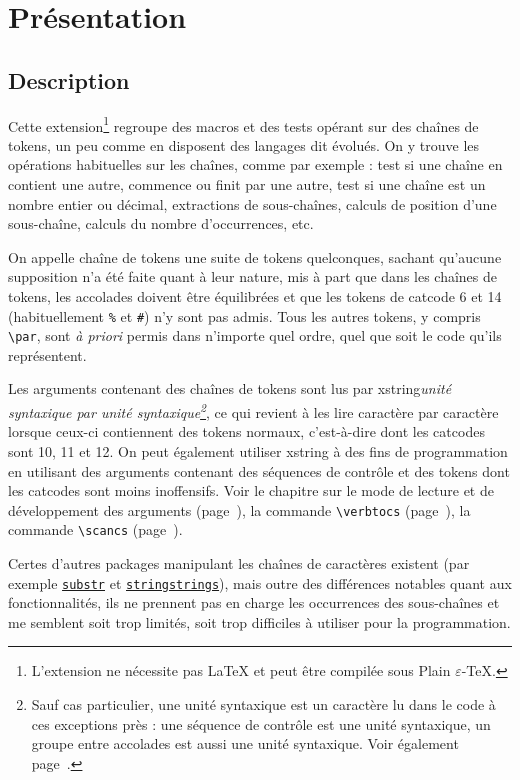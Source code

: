 \documentclass[a4paper,10pt,french]{article}
\newcommand\guill[1]{\og{}#1\fg{}}
\newcommand\US{unité syntaxique\xspace}
\newcommand\Xstring{\textsf{xstring}\xspace}
\newcommand\verbinline{\lstinline[basicstyle=\normalsize\ttfamily]}
\begin{document}
\tableofcontents

%
\section{Présentation}
\subsection{Description}
Cette extension\footnote{L'extension ne nécessite pas \LaTeX{} et peut être compilée sous Plain $\varepsilon$-\TeX{}.} regroupe des macros et des tests opérant sur des chaînes de tokens, un peu comme en disposent des langages dit \guill{évolués}. On y trouve les opérations habituelles sur les chaînes, comme par exemple : test si une chaîne en contient une autre, commence ou finit par une autre, test si une chaîne est un nombre entier ou décimal, extractions de sous-chaînes, calculs de position d'une sous-chaîne, calculs du nombre d'occurrences, etc.\medskip

On appelle \guill{chaîne de tokens} une suite de tokens quelconques, sachant qu'aucune supposition n'a été faite quant à leur nature, mis à part que dans les chaînes de tokens, les accolades doivent être équilibrées et que les tokens de catcode 6 et 14 (habituellement \verb|%| et \verb|#|) n'y sont pas admis. Tous les autres tokens, y compris \verbinline|\par|, sont \emph{à priori} permis dans n'importe quel ordre, quel que soit le code qu'ils représentent.\medskip

Les arguments contenant des chaînes de tokens sont lus par \Xstring \emph{\US par \US\footnote{Sauf cas particulier, une \US est un caractère lu dans le code à ces exceptions près : une séquence de contrôle est une \US, un groupe entre accolades est aussi une \US. Voir également page~\pageref{developpementarguments}.}}, ce qui revient à les lire caractère par caractère lorsque ceux-ci contiennent des tokens \guill{normaux}, c'est-à-dire dont les catcodes sont 10, 11 et 12. On peut également utiliser \Xstring à des fins de programmation en utilisant des arguments contenant des séquences de contrôle et des tokens dont les catcodes sont moins inoffensifs. Voir le chapitre sur le mode de lecture et de développement des arguments (page~\pageref{developpementarguments}), la commande \verbinline|\verbtocs| (page~\pageref{verbtocs}), la commande \verbinline|\scancs| (page~\pageref{scancs}).\medskip

Certes d'autres packages manipulant les chaînes de caractères existent (par exemple \href{http://mirror.ctan.org/tex-archive/macros/latex/contrib/substr/}{\nolinkurl{substr}} et \href{http://mirror.ctan.org/tex-archive/macros/latex/contrib/stringstrings/}{\nolinkurl{stringstrings}}), mais outre des différences notables quant aux fonctionnalités, ils ne prennent pas en charge les occurrences des sous-chaînes et me semblent soit trop limités, soit trop difficiles à utiliser pour la programmation.\medskip
\end{document}
